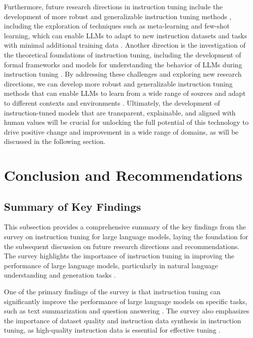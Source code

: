 \documentclass[11pt]{article}
\begin{document}
Furthermore, future research directions in instruction tuning include the development of more robust and generalizable instruction tuning methods \cite{ref149}, including the exploration of techniques such as meta-learning and few-shot learning, which can enable LLMs to adapt to new instruction datasets and tasks with minimal additional training data \cite{ref150}. Another direction is the investigation of the theoretical foundations of instruction tuning, including the development of formal frameworks and models for understanding the behavior of LLMs during instruction tuning \cite{ref6}. By addressing these challenges and exploring new research directions, we can develop more robust and generalizable instruction tuning methods that can enable LLMs to learn from a wide range of sources and adapt to different contexts and environments \cite{ref127}. Ultimately, the development of instruction-tuned models that are transparent, explainable, and aligned with human values will be crucial for unlocking the full potential of this technology to drive positive change and improvement in a wide range of domains, as will be discussed in the following section.

\section{Conclusion and Recommendations}

\subsection{Summary of Key Findings}

This subsection provides a comprehensive summary of the key findings from the survey on instruction tuning for large language models, laying the foundation for the subsequent discussion on future research directions and recommendations. The survey highlights the importance of instruction tuning in improving the performance of large language models, particularly in natural language understanding and generation tasks \cite{ref151}.

One of the primary findings of the survey is that instruction tuning can significantly improve the performance of large language models on specific tasks, such as text summarization and question answering \cite{ref152}. The survey also emphasizes the importance of dataset quality and instruction data synthesis in instruction tuning, as high-quality instruction data is essential for effective tuning \cite{ref153}.
\end{document}
